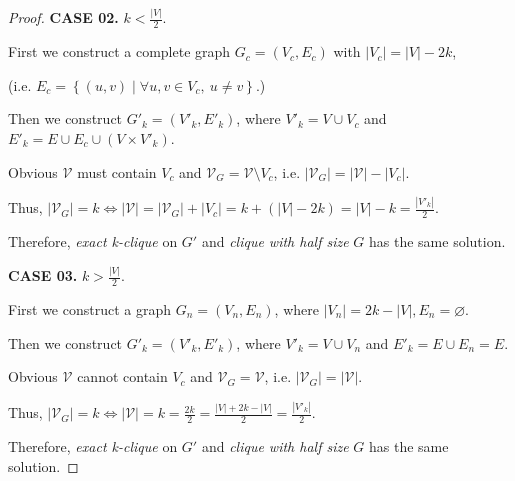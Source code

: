 \documentclass{article}
\newcommand{\set}[1]{\left\{#1\right\}}
\begin{document}
\begin{proof}
    \vspace{1em} \hspace{1.3em}
    \textbf{CASE 02.} $k<\frac{|V|}{2}$. 
    
    \hspace{6.6em}
    First we construct a complete graph $G_{c}=(V_c,E_c)$ with $|V_c|=|V|-2k$,
    
    \hspace{10em}
    (i.e. $E_c=\set{(u,v)\mid \forall u,v\in V_c,\ u\neq v}$.)
    
    \hspace{6.6em}
    Then we construct $G'_k=(V'_k,E'_k)$, where $V'_k=V\cup V_c$ and $E'_k=E\cup E_c\cup (V\times V'_k)$.
    
    \vspace{1em} \hspace{6.6em}
    Obvious $\mathcal{V}$ must contain $V_c$ and $\mathcal{V}_G=\mathcal{V}\setminus V_c$, i.e. $|\mathcal{V}_G|=|\mathcal{V}|-|V_c|$.
    
    \hspace{6.6em}
    Thus, $|\mathcal{V}_G|=k\Longleftrightarrow|\mathcal{V}|=|\mathcal{V}_G|+|V_c|=k+(|V|-2k)=|V|-k=\frac{|V'_k|}{2}$.
    
    \vspace{1em} \hspace{6.6em}
    Therefore, \textit{exact k-clique} on $G'$ and \textit{clique with half size} $G$ has the same solution.
    
    \vspace{1em} \hspace{1.3em}
    \textbf{CASE 03.} $k>\frac{|V|}{2}$.
    
    \hspace{6.6em}
    First we construct a graph $G_n = (V_n,E_n)$, where $|V_n|=2k-|V|,E_n=\varnothing$. 
    
    \hspace{6.6em}
    Then we construct $G'_k=(V'_k,E'_k)$, where $V'_k=V\cup V_n$ and $E'_k=E\cup E_n=E$.
    
    \hspace{6.6em}
    Obvious $\mathcal{V}$ cannot contain $V_c$ and $\mathcal{V}_G=\mathcal{V}$, i.e. $|\mathcal{V}_G|=|\mathcal{V}|$.
    
    \hspace{6.6em}
    Thus, $|\mathcal{V}_G|=k\Longleftrightarrow |\mathcal{V}|=k=\frac{2k}{2}=\frac{|V|+2k-|V|}{2}=\frac{|V'_k|}{2}$.
    
    \vspace{0.5em} \hspace{6.6em}
    Therefore, \textit{exact k-clique} on $G'$ and \textit{clique with half size} $G$ has the same solution.
    

\end{proof}
\end{document}
